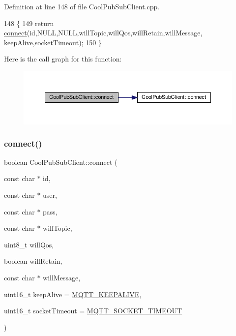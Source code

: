 Definition at line 148 of file Cool\+Pub\+Sub\+Client.\+cpp.


\begin{DoxyCode}
148                                                                                                            
                                                                            \{
149     \textcolor{keywordflow}{return} \hyperlink{class_cool_pub_sub_client_a2664c2ebc302b2fa49f493a339ecc891}{connect}(\textcolor{keywordtype}{id},NULL,NULL,willTopic,willQos,willRetain,willMessage,
      \hyperlink{class_cool_pub_sub_client_a653f086eb3a039c08116bb828e35f7c1}{keepAlive},\hyperlink{class_cool_pub_sub_client_a2d7b7c7dda1313ff1492b158c3712630}{socketTimeout});
150  \}
\end{DoxyCode}
Here is the call graph for this function\+:\nopagebreak
\begin{figure}[H]
\begin{center}
\leavevmode
\includegraphics[width=350pt]{d8/d4b/class_cool_pub_sub_client_af461a5a08fda1c3237e706965704ddb6_cgraph}
\end{center}
\end{figure}
\mbox{\label{class_cool_pub_sub_client_a7e5a85731dd25d90a41f6d859e61da77}} 
\subsubsection{\texorpdfstring{connect()}{connect()}\hspace{0.1cm}{\footnotesize\ttfamily [4/4]}}
{\footnotesize\ttfamily boolean Cool\+Pub\+Sub\+Client\+::connect (\begin{DoxyParamCaption}\item[{const char $\ast$}]{id,  }\item[{const char $\ast$}]{user,  }\item[{const char $\ast$}]{pass,  }\item[{const char $\ast$}]{will\+Topic,  }\item[{uint8\+\_\+t}]{will\+Qos,  }\item[{boolean}]{will\+Retain,  }\item[{const char $\ast$}]{will\+Message,  }\item[{uint16\+\_\+t}]{keep\+Alive = {\ttfamily \hyperlink{_cool_pub_sub_client_8h_afb4dd8c75385ab30e659314df7c2c335}{M\+Q\+T\+T\+\_\+\+K\+E\+E\+P\+A\+L\+I\+VE}},  }\item[{uint16\+\_\+t}]{socket\+Timeout = {\ttfamily \hyperlink{_cool_pub_sub_client_8h_a092cc564e4d7f03fdab6137e30a7f05b}{M\+Q\+T\+T\+\_\+\+S\+O\+C\+K\+E\+T\+\_\+\+T\+I\+M\+E\+O\+UT}} }\end{DoxyParamCaption})}



